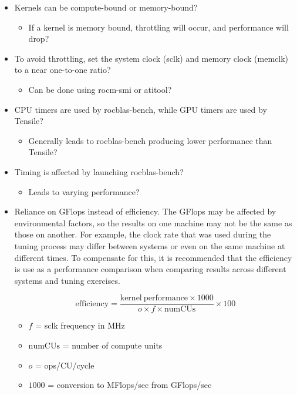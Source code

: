 \documentclass[]{article}
\begin{document}
\begin{itemize}

\item Kernels can be compute-bound or memory-bound?

 \begin{itemize}
 	\item If a kernel is memory bound, throttling will occur, and performance will drop?
 \end{itemize}

\item To avoid throttling, set the system clock (sclk) and memory clock (memclk) to a near one-to-one ratio?

  \begin{itemize}
  	\item Can be done using rocm-smi or atitool?
  \end{itemize}

\item CPU timers are used by rocblas-bench, while GPU timers are used by Tensile?

  \begin{itemize}
   	\item Generally leads to rocblas-bench producing lower performance than Tensile?
  \end{itemize}

\item Timing is affected by launching rocblas-bench?

  \begin{itemize}
  	\item Leads to varying performance?
  \end{itemize}

\item Reliance on GFlops instead of efficiency. The GFlops may be affected by environmental factors, so the results on one machine may not be the same as those on another. For example, the clock rate that was used during the tuning process may differ between systems or even on the same machine at different times. To compensate for this, it is recommended that the efficiency is use as a performance comparison when comparing results across different systems and tuning exercises.

$$ \mathrm{efficiency} = \frac{\mathrm{kernel\ performance} \times 1000}{o \times f \times \mathrm{numCUs}} \times 100 $$

\begin{itemize}
	\item $f$ = sclk frequency in MHz
	\item $\mathrm{numCUs}$ = number of compute units
	\item $o$ = ops/CU/cycle
	\item $1000$ = conversion to MFlops/sec from GFlops/sec
\end{itemize}


\end{itemize}
\end{document}

